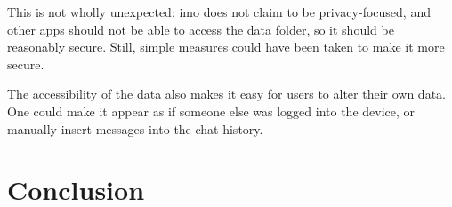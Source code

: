 \documentclass[conference]{IEEEtran}
\begin{document}
This is not wholly unexpected: imo does not claim to be privacy-focused, and
other apps should not be able to access the data folder, so it should be
reasonably secure. Still, simple measures could have been taken to make it more
secure.

The accessibility of the data also makes it easy for users to alter their own
data. One could make it appear as if someone else was logged into the device,
or manually insert messages into the chat history.



\section{Conclusion}



\printbibliography
\end{document}
